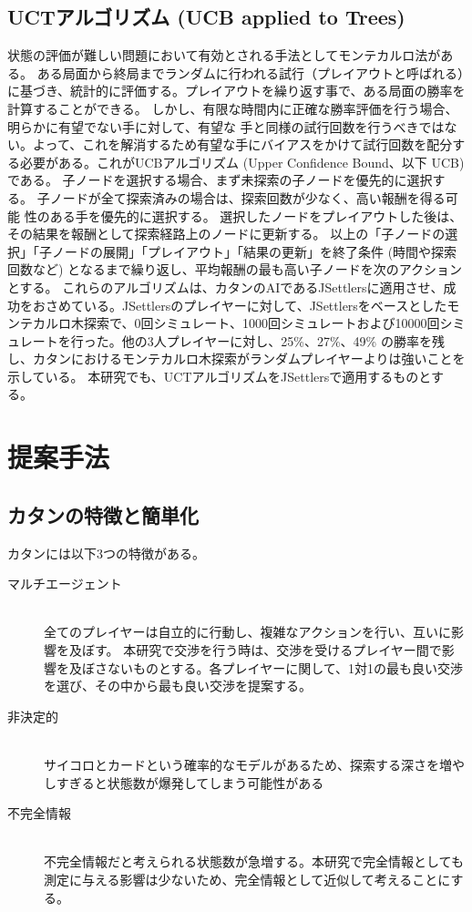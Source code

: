 \documentclass[a4, 10pt,dvipdfmx,twocolumn]{jsarticle}
\begin{document}
\subsection{UCTアルゴリズム (UCB applied to Trees)}
状態の評価が難しい問題において有効とされる手法としてモンテカルロ法がある。
ある局面から終局までランダムに行われる試行（プレイアウトと呼ばれる）に基づき、統計的に評価する。プレイアウトを繰り返す事で、ある局面の勝率を計算することができる。
しかし、有限な時間内に正確な勝率評価を行う場合、明らかに有望でない手に対して、有望な 手と同様の試行回数を行うべきではない。よって、これを解消するため有望な手にバイアスをかけて試行回数を配分する必要がある。これがUCBアルゴリズム (Upper Confidence Bound、以下 UCB) である\cite{kocsis2006bandit}。
子ノードを選択する場合、まず未探索の子ノードを優先的に選択する。
子ノードが全て探索済みの場合は、探索回数が少なく、高い報酬を得る可能
性のある手を優先的に選択する。
選択したノードをプレイアウトした後は、その結果を報酬として探索経路上のノードに更新する。
以上の「子ノードの選択」「子ノードの展開」「プレイアウト」「結果の更新」を終了条件 (時間や探索回数など) となるまで繰り返し、平均報酬の最も高い子ノードを次のアクションとする。
これらのアルゴリズムは、カタンのAIであるJSettlersに適用させ、成功をおさめている\cite{szita2010monte}。JSettlersのプレイヤーに対して、JSettlersをベースとしたモンテカルロ木探索で、0回シミュレート、1000回シミュレートおよび10000回シミュレートを行った。他の3人プレイヤーに対し、25\%、27\%、49\% の勝率を残し、カタンにおけるモンテカルロ木探索がランダムプレイヤーよりは強いことを示している。
本研究でも、UCTアルゴリズムをJSettlersで適用するものとする。
\section{提案手法}
\subsection{カタンの特徴と簡単化}
カタンには以下3つの特徴がある。
\begin{description}
\item[マルチエージェント]\mbox{}\\ 
全てのプレイヤーは自立的に行動し、複雑なアクションを行い、互いに影響を及ぼす。
本研究で交渉を行う時は、交渉を受けるプレイヤー間で影響を及ぼさないものとする。各プレイヤーに関して、1対1の最も良い交渉を選び、その中から最も良い交渉を提案する。
\item[非決定的]\mbox{}\\ 
サイコロとカードという確率的なモデルがあるため、探索する深さを増やしすぎると状態数が爆発してしまう可能性がある
\item[不完全情報]\mbox{}\\ 不完全情報だと考えられる状態数が急増する。本研究で完全情報としても測定に与える影響は少ないため、完全情報として近似して考えることにする。
\end{description}
\end{document}
